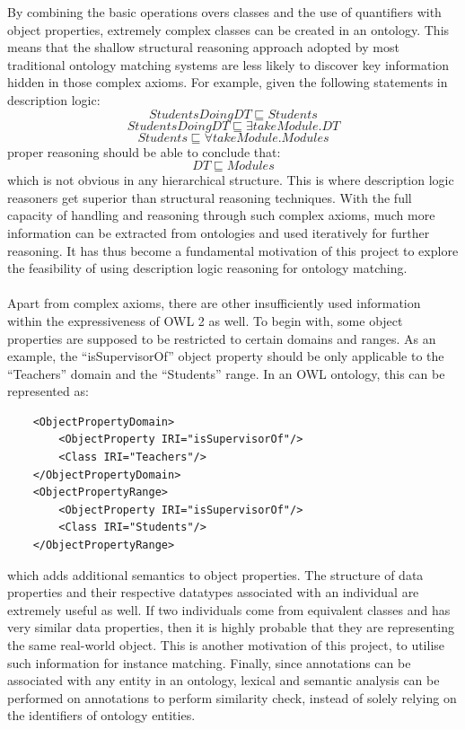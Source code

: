 By combining the basic operations overs classes and the use of quantifiers with object properties, extremely complex classes can be created in an ontology. This means that the shallow structural reasoning approach adopted by most traditional ontology matching systems are less likely to discover key information hidden in those complex axioms. For example, given the following statements in description logic:
$$StudentsDoingDT \sqsubseteq Students$$
$$StudentsDoingDT \sqsubseteq \exists takeModule.DT$$
$$Students \sqsubseteq \forall takeModule.Modules$$
proper reasoning should be able to conclude that:
$$DT \sqsubseteq Modules$$
which is not obvious in any hierarchical structure. This is where description logic reasoners get superior than structural reasoning techniques. With the full capacity of handling and reasoning through such complex axioms, much more information can be extracted from ontologies and used iteratively for further reasoning. It has thus become a fundamental motivation of this project to explore the feasibility of using description logic reasoning for ontology matching.
\\\\
Apart from complex axioms, there are other insufficiently used information within the expressiveness of OWL 2 as well. To begin with, some object properties are supposed to be restricted to certain domains and ranges. As an example, the ``isSupervisorOf'' object property should be only applicable to the ``Teachers'' domain and the ``Students'' range. In an OWL ontology, this can be represented as:

\lstset{language=Java}
\begin{lstlisting}
    <ObjectPropertyDomain>
        <ObjectProperty IRI="isSupervisorOf"/>
        <Class IRI="Teachers"/>
    </ObjectPropertyDomain>
    <ObjectPropertyRange>
        <ObjectProperty IRI="isSupervisorOf"/>
        <Class IRI="Students"/>
    </ObjectPropertyRange>
\end{lstlisting}

which adds additional semantics to object properties. The structure of data properties and their respective datatypes associated with an individual are extremely useful as well. If two individuals come from equivalent classes and has very similar data properties, then it is highly probable that they are representing the same real-world object. This is another motivation of this project, to utilise such information for instance matching. Finally, since annotations can be associated with any entity in an ontology, lexical and semantic analysis can be performed on annotations to perform similarity check, instead of solely relying on the identifiers of ontology entities.


